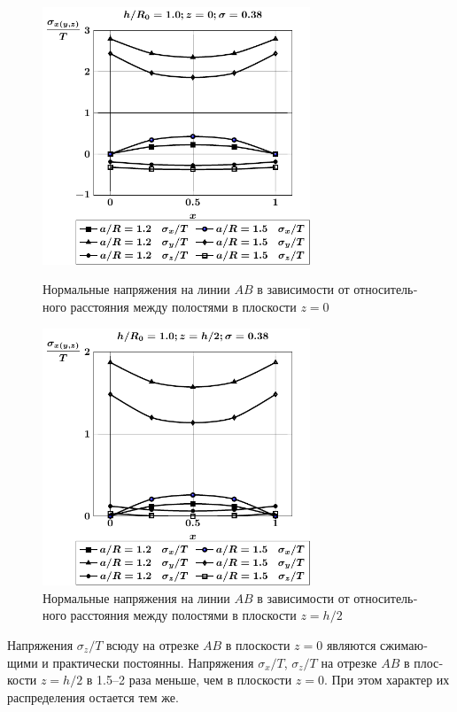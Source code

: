 \begin{russian}
\begin{figure}[h!]
\centering\footnotesize
\parbox[b]{7.5cm}{\centering\includegraphics[width=8cm]{cav31-a-h10-r10-z0.pdf}
\caption{Нормальные напряжения на линии $AB$ в зависимости от относительного расстояния между полостями в плоскости $z=0$
\label{f:7:134}}}\hfil\hfil
\parbox[b]{7.5cm}{\centering\includegraphics[width=8cm]{cav31-a-h10-r10-z1.pdf}
\caption{Нормальные напряжения на линии $AB$ в зависимости от относительного расстояния между полостями в плоскости $z=h/2$
\label{f:7:135}}}
\end{figure}

Напряжения $\sigma_z/T$ всюду на отрезке $AB$ в плоскости $z=0$ являются сжимающими и практически постоянны. Напряжения $\sigma_x/T$, $\sigma_z/T$ на отрезке $AB$ в плоскости $z=h/2$ в 1.5--2 раза меньше, чем в плоскости $z=0$. При этом характер их распределения остается тем же.


\end{russian}
